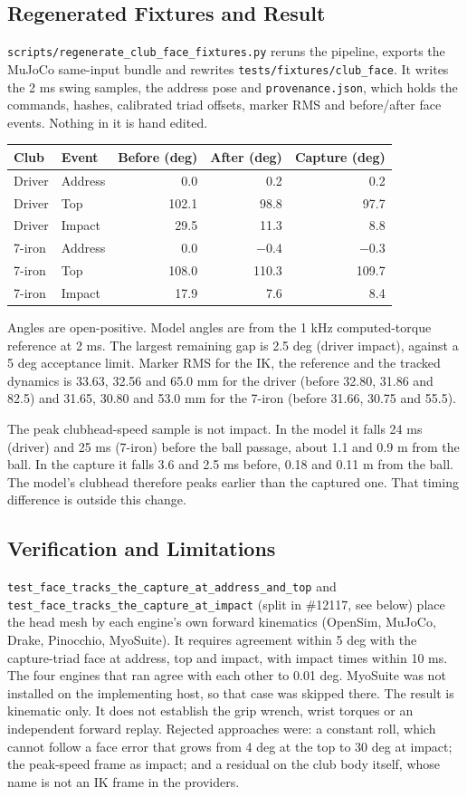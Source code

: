 \documentclass[11pt,a4paper]{article}
\begin{document}
\subsection{Regenerated Fixtures and Result}
\texttt{scripts/regenerate\_club\_face\_fixtures.py} reruns the pipeline,
exports the MuJoCo same-input bundle and rewrites
\texttt{tests/fixtures/club\_face}. It writes the 2 ms swing samples, the
address pose and \texttt{provenance.json}, which holds the commands, hashes,
calibrated triad offsets, marker RMS and before/after face events. Nothing in
it is hand edited.
\begin{center}
\begin{tabular}{@{}llrrr@{}}
\toprule
Club & Event & Before (deg) & After (deg) & Capture (deg) \\
\midrule
Driver & Address & 0.0 & 0.2 & 0.2 \\
Driver & Top & 102.1 & 98.8 & 97.7 \\
Driver & Impact & 29.5 & 11.3 & 8.8 \\
7-iron & Address & 0.0 & $-0.4$ & $-0.3$ \\
7-iron & Top & 108.0 & 110.3 & 109.7 \\
7-iron & Impact & 17.9 & 7.6 & 8.4 \\
\bottomrule
\end{tabular}
\end{center}
Angles are open-positive. Model angles are from the 1 kHz computed-torque
reference at 2 ms. The largest remaining gap is 2.5 deg (driver impact),
against a 5 deg acceptance limit. Marker RMS for the IK, the reference and the
tracked dynamics is 33.63, 32.56 and 65.0 mm for the driver (before 32.80,
31.86 and 82.5) and 31.65, 30.80 and 53.0 mm for the 7-iron (before 31.66,
30.75 and 55.5).

The peak clubhead-speed sample is not impact. In the model it falls 24 ms
(driver) and 25 ms (7-iron) before the ball passage, about 1.1 and 0.9 m from
the ball. In the capture it falls 3.6 and 2.5 ms before, 0.18 and 0.11 m from
the ball. The model's clubhead therefore peaks earlier than the captured one.
That timing difference is outside this change.

\subsection{Verification and Limitations}
\texttt{test\_face\_tracks\_the\_capture\_at\_address\_and\_top} and
\texttt{test\_face\_tracks\_the\_capture\_at\_impact} (split in \#12117, see
below) place the head mesh by each engine's own forward kinematics (OpenSim,
MuJoCo, Drake, Pinocchio, MyoSuite). It requires agreement within 5 deg with
the capture-triad face at address, top and impact, with impact times within
10 ms. The four engines that ran agree with each other to 0.01 deg. MyoSuite
was not installed on the implementing host, so that case was skipped there.
The result is kinematic only. It does not establish the grip wrench, wrist
torques or an independent forward replay. Rejected approaches were: a
constant roll, which cannot follow a face error that grows from 4 deg at the
top to 30 deg at impact; the peak-speed frame as impact; and a residual on
the club body itself, whose name is not an IK frame in the providers.
\end{document}
